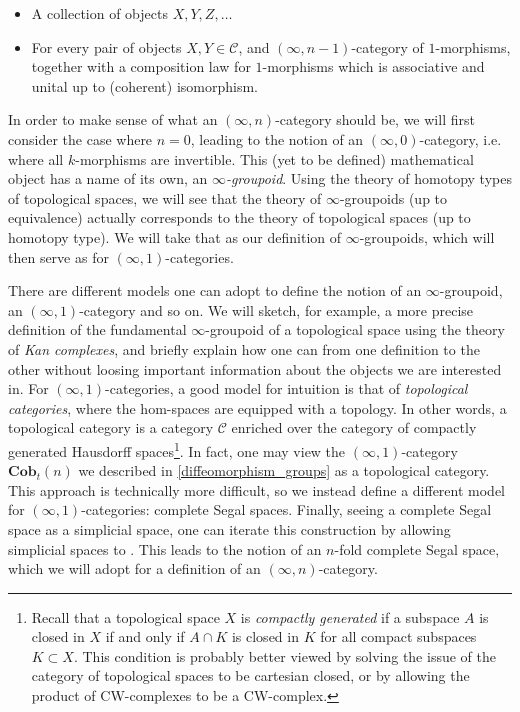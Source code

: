 \documentclass[a4paper,11pt]{article}
\newcommand{\ccal}{\mathcal{C}}
\theoremstyle{plain}
\theoremstyle{definition}
\theoremstyle{remark}
\begin{document}
\begin{itemize}
    \item A collection of objects $X, Y ,Z, \dots$
    \item For every pair of objects $X, Y \in \ccal$, and $(\infty, n-1)$-category of $1$-morphisms, together with a composition law for $1$-morphisms which is associative and unital up to (coherent) isomorphism. 
\end{itemize}

In order to make sense of what an $(\infty, n)$-category should be, we will first consider the case where $n = 0$, leading to the notion of an $(\infty, 0)$-category, i.e. where all $k$-morphisms are invertible. This (yet to be defined) mathematical object has a name of its own, an \textit{$\infty$-groupoid}. Using the theory of homotopy types of topological spaces, we will see that the theory of $\infty$-groupoids (up to equivalence) actually corresponds to the theory of topological spaces (up to homotopy type). We will take that as our definition of $\infty$-groupoids, which will then serve as  for $(\infty, 1)$-categories. 


There are different models one can adopt to define the notion of an $\infty$-groupoid, an $(\infty, 1)$-category and so on. We will sketch, for example, a more precise definition of the fundamental $\infty$-groupoid of a topological space using the theory of \textit{Kan complexes}, and briefly explain how one can  from one definition to the other without loosing important information about the objects we are interested in. For $(\infty, 1)$-categories, a good model for intuition is that of \textit{topological categories}, where the hom-spaces are equipped with a topology. In other words, a topological category is a category $\ccal$ enriched over the category of compactly generated Hausdorff spaces\footnote{Recall that a topological space $X$ is \textit{compactly generated} if a subspace $A$ is closed in $X$ if and only if $A \cap K$ is closed in $K$ for all compact subspaces $K \subset X$. This condition is probably better viewed by solving the issue of the category of topological spaces to be cartesian closed, or by allowing the product of CW-complexes to be a CW-complex.}. In fact, one may view the $(\infty, 1)$-category $\textbf{Cob}_t(n)$ we described in \ref{diffeomorphism_groups} as a topological category. This approach is technically more difficult, so we instead define a different model for $(\infty, 1)$-categories: complete Segal spaces. Finally, seeing a complete Segal space as a simplicial space, one can iterate this construction by allowing simplicial spaces to . This leads to the notion of an $n$-fold complete Segal space, which we will adopt for a definition of an $(\infty, n)$-category. 
\end{document}
